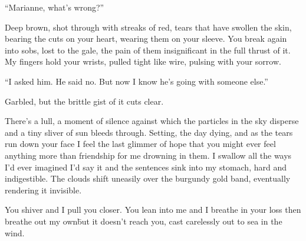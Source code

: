 ``Marianne, what’s wrong?''

Deep brown, shot through with streaks of red, tears that have swollen
the skin, bearing the cuts on your heart, wearing them on your
sleeve. You break again into sobs, lost to the gale, the pain of them
insignificant in the full thrust of it. My fingers hold your wrists,
pulled tight like wire, pulsing with your sorrow.

``I asked him. He said no. But now I know he’s going with someone else.''

Garbled, but the brittle gist of it cuts clear.

There’s a lull, a moment of silence against which the particles in the
sky disperse and a tiny sliver of sun bleeds through. Setting, the day
dying, and as the tears run down your face I feel the last glimmer of
hope that you might ever feel anything more than friendship for me
drowning in them. I swallow all the ways I’d ever imagined I’d say it
and the sentences sink into my stomach, hard and indigestible. The
clouds shift uneasily over the burgundy gold band, eventually
rendering it invisible.

You shiver and I pull you closer. You lean into me and I breathe in
your loss then breathe out my own\=but it doesn’t reach you, cast
carelessly out to sea in the wind.


